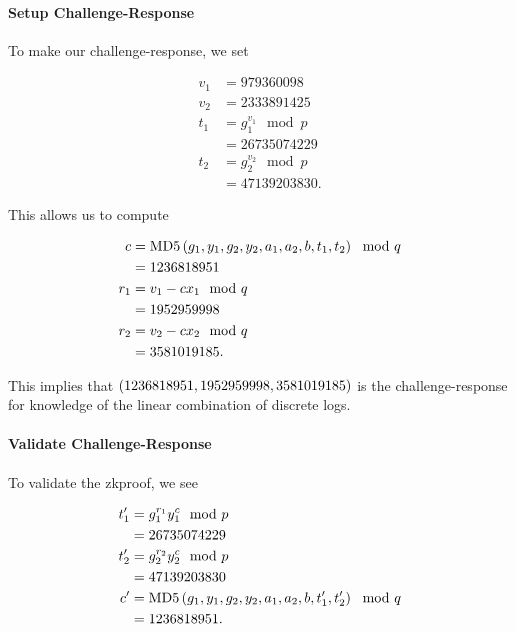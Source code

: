 \begin{example}
\paragraph{Setup Challenge-Response}
To make our challenge-response, we set

\begin{align}
    v_{1} &= 979360098 \nonumber\\
    v_{2} &= 2333891425 \nonumber\\
    t_{1} &= g_{1}^{v_{1}} \mod p \nonumber\\
        &= 26735074229 \nonumber\\
    t_{2} &= g_{2}^{v_{2}} \mod p \nonumber\\
        &= 47139203830.
\end{align}

\noindent
This allows us to compute

\begin{align}
    c &= \text{MD5{}}\left( g_{1},y_{1},g_{2},y_{2},a_{1},a_{2},b,
            t_{1},t_{2} \right) \mod q \nonumber\\
        &= 1236818951 \nonumber\\
    r_{1} &= v_{1} - cx_{1} \mod q \nonumber\\
        &= 1952959998 \nonumber\\
    r_{2} &= v_{2} - cx_{2} \mod q \nonumber\\
        &= 3581019185.
\end{align}

\noindent
This implies that $\left( 1236818951,1952959998,3581019185 \right)$
is the challenge-response for knowledge of the linear combination
of \glspl{discrete log}.

\paragraph{Validate Challenge-Response}
To validate the \gls{zkproof}, we see

\begin{align}
    t_{1}' &= g_{1}^{r_{1}}y_{1}^{c} \mod p \nonumber\\
        &= 26735074229 \nonumber\\
    t_{2}' &= g_{2}^{r_{2}}y_{2}^{c} \mod p \nonumber\\
        &= 47139203830 \nonumber\\
    c' &= \text{MD5{}}\left( g_{1},y_{1},g_{2},y_{2},a_{1},a_{2},b,
            t_{1}',t_{2}' \right) \mod q \nonumber\\
        &= 1236818951.
\end{align}


\end{example}
